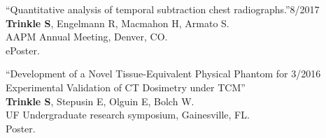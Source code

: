 \documentclass[10pt,letterpaper]{article}
\begin{document}
\begin{benumerate}{12}
\item{``Quantitative analysis of temporal subtraction chest radiographs.''\hfill 8/2017\\
    \textbf{Trinkle S}, Engelmann R, Macmahon H, Armato S. \\
    AAPM Annual Meeting, Denver, CO. \\
    ePoster.}

\item{``Development of a Novel Tissue-Equivalent Physical Phantom for \hfill 3/2016\\
    Experimental Validation of CT Dosimetry under TCM'' \\
    \textbf{Trinkle S}, Stepusin E, Olguin E, Bolch W.\\
    UF Undergraduate research symposium, Gainesville, FL. \\
    Poster.}

\end{benumerate}
\end{document}
